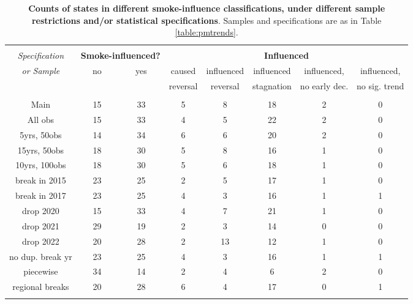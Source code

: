 \begin{table}[!htbp] \centering 
  \caption{\textbf{Counts of states in different smoke-influence classifications, under different sample restrictions and/or statistical specifications}. Samples and specifications are as in Table \ref{table:pmtrends}.} 
  \label{table:smokeinfluence} 
\footnotesize 
\begin{tabular}{@{\extracolsep{5pt}} cccccccc} 
\\[-1.8ex]\hline 
\hline \\[-1.8ex] 
\textit{Specification} & \multicolumn{2}{c}{\textbf{Smoke-influenced?}} & \multicolumn{5}{c}{\textbf{Influenced}} \\ \cline{4-8}
\textit{or Sample} & no & yes & caused & influenced  & influenced  & influenced, & influenced, \\ 
 &  &  & reversal & reversal &  stagnation & no early dec. & no sig. trend\\ 
\hline \\[-1.8ex] 
Main & 15 & 33 & 5 & 8 & 18 & 2 & 0 \\ 
All obs & 15 & 33 & 4 & 5 & 22 & 2 & 0 \\ 
5yrs, 50obs & 14 & 34 & 6 & 6 & 20 & 2 & 0 \\ 
15yrs, 50obs & 18 & 30 & 5 & 8 & 16 & 1 & 0 \\ 
10yrs, 100obs & 18 & 30 & 5 & 6 & 18 & 1 & 0 \\ 
break in 2015 & 23 & 25 & 2 & 5 & 17 & 1 & 0 \\ 
break in 2017 & 23 & 25 & 4 & 3 & 16 & 1 & 1 \\ 
drop 2020 & 15 & 33 & 4 & 7 & 21 & 1 & 0 \\ 
drop 2021 & 29 & 19 & 2 & 3 & 14 & 0 & 0 \\ 
drop 2022 & 20 & 28 & 2 & 13 & 12 & 1 & 0 \\ 
no dup. break yr & 23 & 25 & 4 & 3 & 16 & 1 & 1 \\ 
piecewise & 34 & 14 & 2 & 4 & 6 & 2 & 0 \\ 
regional breaks & 20 & 28 & 6 & 4 & 17 & 0 & 1 \\ 
\hline \\[-1.8ex] 
\end{tabular} 
\end{table} 

